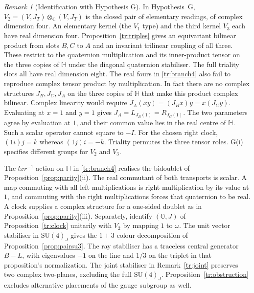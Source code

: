 \documentclass[aps,pra,onecolumn,superscriptaddress,nofootinbib,10pt]{revtex4-2}
\theoremstyle{definition}
\theoremstyle{remark}
\newtheorem{remark}[theorem]{Remark}
\newcommand{\SU}{\mathrm{SU}}
\begin{document}
\begin{remark}[Identification with Hypothesis G]\label{tr:matching}
In Hypothesis~G, \(V_2=(V,J_T)\otimes_{\mathbb C}(V,J_T)\)
is the closed pair of elementary readings, of complex dimension four.
An elementary kernel (the \(V_1\) type) and the third kernel \(V_3\)
each have real dimension four. Proposition~\ref{tr:triples}
gives an equivariant bilinear product from slots \(B,C\) to \(A\)
and an invariant trilinear coupling of all three. These restrict
to the quaternion multiplication and its inner-product tensor on
the three copies of \(\mathbb H\) under the diagonal quaternion
stabiliser. The full triality slots all have real dimension eight.
The real fours in \eqref{tr:branch4} also fail to reproduce
complex tensor product by multiplication. In fact there are no
complex structures \(J_B,J_C,J_A\) on the three copies of
\(\mathbb H\) that make this product complex bilinear.
Complex linearity would require
\(J_A(xy)=(J_B x)y=x(J_C y)\). Evaluating at \(x=1\) and
\(y=1\) gives \(J_A=L_{J_B(1)}=R_{J_C(1)}\).
The two parameters agree by evaluation at \(1\), and their
common value lies in the real centre of \(\mathbb H\).
Such a scalar operator cannot square to \(-I\).
For the chosen right clock, \((1i)j=k\) whereas \((1j)i=-k\).
Triality permutes the three tensor roles. G(i) specifies different
groups for \(V_2\) and \(V_3\).

The \(l x r^{-1}\) action on \(\mathbb H\) in \eqref{tr:branch4}
realises the bidoublet of Proposition~\ref{prop:parity}(ii).
The real commutant of both transports is scalar. A map commuting
with all left multiplications is right multiplication by its value
at \(1\), and commuting with the right multiplications forces that
quaternion to be real. A clock supplies a complex structure for
a one-sided doublet as in Proposition~\ref{prop:parity}(iii).
Separately, identify \((\mathbb O,J)\) of Proposition~\ref{tr:clock}
unitarily with \(V_2\) by mapping \(1\) to \(\omega\).
The unit vector stabiliser in \(\SU(4)_J\) gives the
\(1+3\) colour decomposition of Proposition~\ref{prop:pairsu3}.
The ray stabiliser has a traceless central generator
\(B-L\), with eigenvalues \(-1\) on the line and \(1/3\)
on the triplet in that proposition's normalization.
The joint stabiliser in Remark~\ref{tr:joint} preserves two
complex two-planes, excluding the full \(\SU(4)_J\).
Proposition~\ref{tr:obstruction} excludes alternative placements
of the gauge subgroup as well.


\end{remark}
\end{document}
